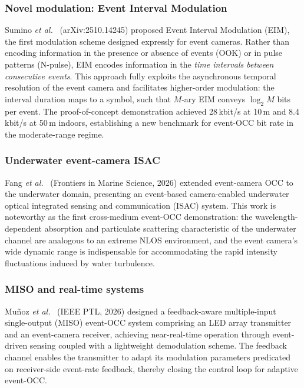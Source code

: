 \documentclass[10pt,a4paper]{article}
\begin{document}
\subsubsection{Novel modulation: Event Interval Modulation}
Sumino \emph{et al.}~\cite{sumino2025eim} (arXiv:2510.14245) proposed
Event Interval Modulation (EIM), the first modulation scheme designed
expressly for event cameras. Rather than encoding information in the
presence or absence of events (OOK) or in pulse patterns (N-pulse), EIM
encodes information in the \emph{time intervals between consecutive
events}. This approach fully exploits the asynchronous temporal
resolution of the event camera and facilitates higher-order modulation:
the interval duration maps to a symbol, such that $M$-ary EIM conveys
$\log_2 M$ bits per event. The proof-of-concept demonstration achieved
28\,kbit/s at 10\,m and 8.4\,kbit/s at 50\,m indoors, establishing a new
benchmark for event-OCC bit rate in the moderate-range regime.

\subsubsection{Underwater event-camera ISAC}
Fang \emph{et al.}~\cite{fang2026underwater} (Frontiers in Marine
Science, 2026) extended event-camera OCC to the underwater domain,
presenting an event-based camera-enabled underwater optical integrated
sensing and communication (ISAC) system. This work is noteworthy as the
first cross-medium event-OCC demonstration: the wavelength-dependent
absorption and particulate scattering characteristic of the underwater
channel are analogous to an extreme NLOS environment, and the event
camera's wide dynamic range is indispensable for accommodating the rapid
intensity fluctuations induced by water turbulence.

\subsubsection{MISO and real-time systems}
Mu\~noz \emph{et al.}~\cite{munoz2026miso} (IEEE PTL, 2026) designed a
feedback-aware multiple-input single-output (MISO) event-OCC system
comprising an LED array transmitter and an event-camera receiver,
achieving near-real-time operation through event-driven sensing coupled
with a lightweight demodulation scheme. The feedback channel enables the
transmitter to adapt its modulation parameters predicated on
receiver-side event-rate feedback, thereby closing the control loop for
adaptive event-OCC.
\end{document}
